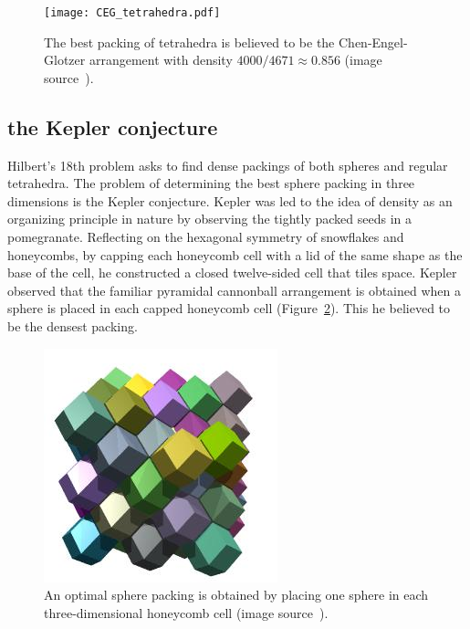 \documentclass{llncs}
\begin{document}
\begin{figure}[h!]
  \centering
\texttt{[image: CEG\_tetrahedra.pdf]}
  \caption{The best packing of
tetrahedra is believed to be the Chen-Engel-Glotzer arrangement with density
$4000/4671\approx 0.856$ (image source~\cite{Chen-2010}).}
\label{fig:CEG}
\end{figure}

\subsection{the Kepler conjecture}

Hilbert's 18th problem asks to find dense packings of both spheres and
regular tetrahedra.  The problem of determining the best sphere
packing in three dimensions is the Kepler conjecture.  Kepler was led
to the idea of density as an organizing principle in nature by
observing the tightly packed seeds in a pomegranate.  Reflecting on
the hexagonal symmetry of snowflakes and honeycombs, by capping each
honeycomb cell with a lid of the same shape as the base of the cell,
he constructed a closed twelve-sided cell that tiles space.  Kepler
observed that the familiar pyramidal cannonball arrangement is
obtained when a sphere is placed in each capped honeycomb cell
(Figure~\ref{fig:rhombic}).  This he believed to be the densest
packing.

\begin{figure}[h!]
  \centering
\includegraphics[scale=0.5]{Rhombic_dodecahedra.jpg}
\caption{An optimal sphere packing is obtained by placing one sphere
  in each three-dimensional honeycomb cell (image
  source~\cite{rhombic}).}
\label{fig:rhombic}
\end{figure}
\end{document}
